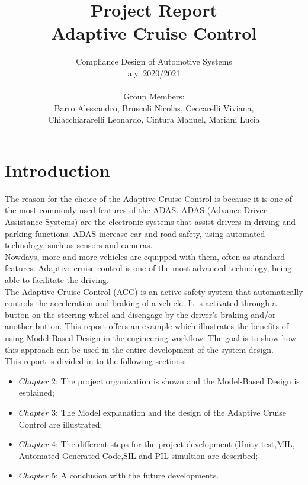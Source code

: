 \documentclass[12pt,a4paper]{report}
\begin{document}
	
	\author{Compliance Design of Automotive Systems \\
		a.y. 2020/2021\\\\
		Group Members:\\
		Barro Alessandro, Bruscoli Nicolas, Ceccarelli Viviana, \\
		Chiacchiararelli Leonardo, Cintura Manuel, Mariani Lucia\\
	}
	\title{Project Report\\
		Adaptive Cruise Control
	}
	\maketitle
	
\tableofcontents
\listoffigures


\chapter{Introduction}
The reason for the choice of the Adaptive Cruise Control is because it is one of the most commonly used features of the ADAS. ADAS (Advance Driver Assistance Systems) are the electronic systems that assist drivers in driving and parking functions. ADAS increase car and road safety, using automated technology, such as sensors and cameras.\\ Nowdays, more and more vehicles are equipped with them, often as standard features. Adaptive cruise control is one of the most advanced technology, being able to facilitate the driving.\\
The Adaptive Cruise Control (ACC) is an active safety system that automatically controls the acceleration and braking of a vehicle. It is activated through a button on the steering wheel and disengage by the driver’s braking and/or another button.
This report offers an example which illustrates the benefits of using Model-Based Design in the engineering workflow.
The goal is to show how this approach can be used in the entire development of the system design.\\
This report is divided in to the following sections:
\begin{itemize}
	\item $Chapter$ $2$: The project organization is shown and the Model-Based Design is esplained;
	\item $Chapter$ $3$: The Model explanation and the design of the Adaptive Cruise Control are illustrated;
	\item $Chapter$ $4$: The different steps for the project development (Unity test,MIL, Automated Generated Code,SIL and PIL simultion are described;
	\item $Chapter$ $5$: A conclusion with the future developments.
\end{itemize}
\end{document}
